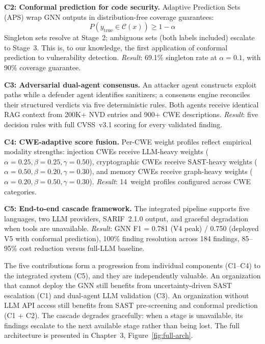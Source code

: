 \textbf{C2: Conformal prediction for code security.} Adaptive Prediction Sets (APS) wrap GNN outputs in distribution-free coverage guarantees:
\begin{equation}
P\!\left(y_{\text{true}} \in \mathcal{C}(x)\right) \geq 1 - \alpha
\label{eq:ch1-conformal}
\end{equation}
\noindent Singleton sets resolve at Stage~2; ambiguous sets (both labels included) escalate to Stage~3. This is, to our knowledge, the first application of conformal prediction to vulnerability detection. \textit{Result}: 69.1\% singleton rate at $\alpha = 0.1$, with 90\% coverage guarantee.

\textbf{C3: Adversarial dual-agent consensus.} An attacker agent constructs exploit paths while a defender agent identifies sanitizers; a consensus engine reconciles their structured verdicts via five deterministic rules. Both agents receive identical RAG context from 200K+ NVD entries and 900+ CWE descriptions. \textit{Result}: five decision rules with full CVSS~v3.1 scoring for every validated finding.

\textbf{C4: CWE-adaptive score fusion.} Per-CWE weight profiles reflect empirical modality strengths: injection CWEs receive LLM-heavy weights ($\alpha=0.25, \beta=0.25, \gamma=0.50$), cryptographic CWEs receive SAST-heavy weights ($\alpha=0.50, \beta=0.20, \gamma=0.30$), and memory CWEs receive graph-heavy weights ($\alpha=0.20, \beta=0.50, \gamma=0.30$). \textit{Result}: 14~weight profiles configured across CWE categories.

\textbf{C5: End-to-end cascade framework.} The integrated pipeline supports five languages, two LLM providers, SARIF~2.1.0 output, and graceful degradation when tools are unavailable. \textit{Result}: GNN F1 = 0.781 (V4 peak) / 0.750 (deployed V5 with conformal prediction), 100\% finding resolution across 184 findings, 85--95\% cost reduction versus full-LLM baseline.

The five contributions form a progression from individual components (C1--C4) to the integrated system (C5), and they are independently valuable. An organization that cannot deploy the GNN still benefits from uncertainty-driven SAST escalation (C1) and dual-agent LLM validation (C3). An organization without LLM API access still benefits from SAST pre-screening and conformal prediction (C1 + C2). The cascade degrades gracefully: when a stage is unavailable, its findings escalate to the next available stage rather than being lost. The full architecture is presented in Chapter~3, Figure~\ref{fig:full-arch}.


